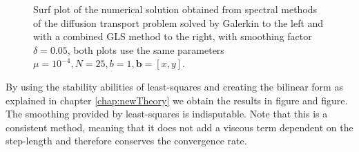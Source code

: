 \begin{figure}[h]
\begin{subfigure}[b]{0.48\textwidth}
  \end{subfigure}
  \vspace{-0.1\baselineskip}
  \caption{Surf plot of the numerical solution obtained from spectral methods of the diffusion transport problem solved by Galerkin to the left and with a combined GLS method to the right, with smoothing factor $\delta = 0.05$, both plots use the same parameters $\mu = 10^{-4}, N=25,b = 1,\mathbf{b} = [x,y]$.}
  \label{fig:SurfDiffTransPositive}
\end{figure}
%

By using the stability abilities of least-squares and creating the bilinear form as explained in chapter \ref{chap:newTheory} we obtain the results in figure and figure. The smoothing provided by least-squares is indisputable. Note that this is a consistent method, meaning that it does not add a viscous term dependent on the step-length and therefore conserves the convergence rate. 

